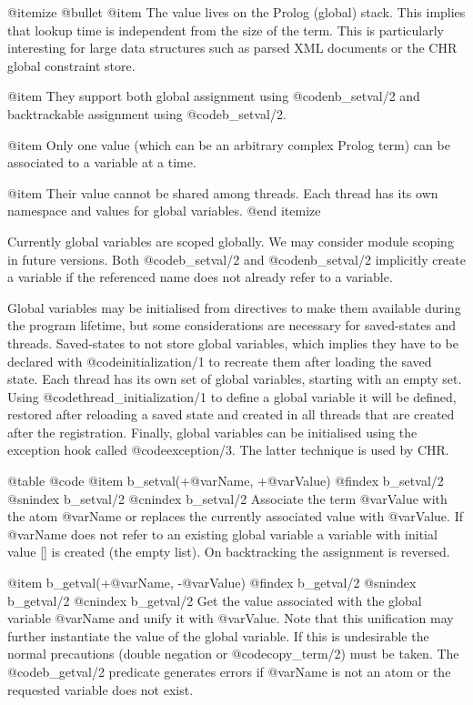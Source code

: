 {{{{{{@itemize @bullet
@item The value lives on the Prolog (global) stack. This implies that
lookup time is independent from the size of the term. This is
particularly interesting for large data structures such as parsed XML
documents or the CHR global constraint store. 

@item They support both global assignment using @code{nb_setval/2} and
backtrackable assignment using @code{b_setval/2}.

@item Only one value (which can be an arbitrary complex Prolog term)
can be associated to a variable at a time. 

@item Their value cannot be shared among threads. Each thread has its own
namespace and values for global variables.
@end itemize

Currently global variables are scoped globally. We may consider module
scoping in future versions.   Both @code{b_setval/2} and
@code{nb_setval/2} implicitly create a variable if the referenced name
does not already refer to a variable.

Global variables may be initialised from directives to make them
available during the program lifetime, but some considerations are
necessary for saved-states and threads. Saved-states to not store
global variables, which implies they have to be declared with
@code{initialization/1} to recreate them after loading the saved
state. Each thread has its own set of global variables, starting with
an empty set. Using @code{thread_initialization/1} to define a global
variable it will be defined, restored after reloading a saved state
and created in all threads that are created after the
registration. Finally, global variables can be initialised using the
exception hook called @code{exception/3}. The latter technique is used
by CHR.

@table @code
@item b_setval(+@var{Name}, +@var{Value}) 
@findex b_setval/2
@snindex b_setval/2
@cnindex b_setval/2
Associate the term @var{Value} with the atom @var{Name} or replaces
the currently associated value with @var{Value}. If @var{Name} does
not refer to an existing global variable a variable with initial value
[] is created (the empty list). On backtracking the assignment is
reversed. 

@item b_getval(+@var{Name}, -@var{Value}) 
@findex b_getval/2
@snindex b_getval/2
@cnindex b_getval/2
Get the value associated with the global variable @var{Name} and unify
it with @var{Value}. Note that this unification may further
instantiate the value of the global variable. If this is undesirable
the normal precautions (double negation or @code{copy_term/2}) must be
taken. The @code{b_getval/2} predicate generates errors if @var{Name} is not
an atom or the requested variable does not exist. 

}}}}}}
